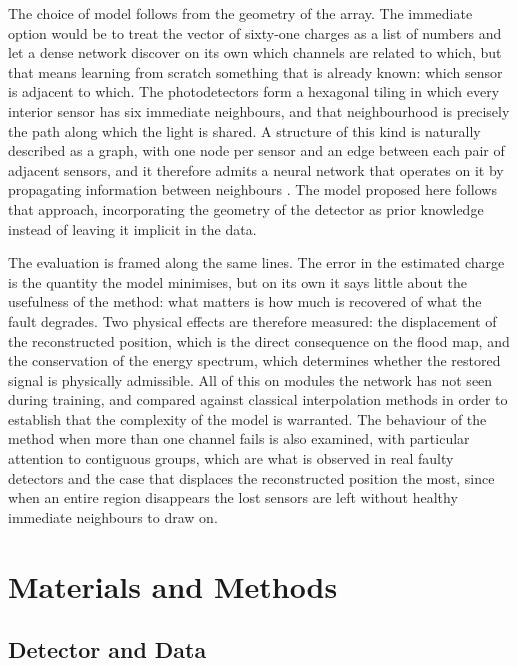 \documentclass[10pt,conference]{IEEEtran}
\begin{document}
The choice of model follows from the geometry of the array. The immediate
option would be to treat the vector of sixty-one charges as a list of
numbers and let a dense network discover on its own which channels are
related to which, but that means learning from scratch something that is
already known: which sensor is adjacent to which. The photodetectors form a
hexagonal tiling in which every interior sensor has six immediate
neighbours, and that neighbourhood is precisely the path along which the
light is shared. A structure of this kind is naturally described as a graph,
with one node per sensor and an edge between each pair of adjacent sensors,
and it therefore admits a neural network that operates on it by propagating
information between neighbours \cite{hamilton2017graphsage}. The model
proposed here follows that approach, incorporating the geometry of the
detector as prior knowledge instead of leaving it implicit in the data.

The evaluation is framed along the same lines. The error in the estimated
charge is the quantity the model minimises, but on its own it says little
about the usefulness of the method: what matters is how much is recovered of
what the fault degrades. Two physical effects are therefore measured: the
displacement of the reconstructed position, which is the direct consequence
on the flood map, and the conservation of the energy spectrum, which
determines whether the restored signal is physically admissible. All of this
on modules the network has not seen during training,
and compared against classical interpolation methods in order to establish
that the complexity of the model is warranted. The behaviour of the method
when more than one channel fails is also examined, with particular attention
to contiguous groups, which are what is observed in real faulty detectors
and the case that displaces the reconstructed position the most, since when an
entire region disappears the lost sensors are left without healthy immediate
neighbours to draw on.

\section{Materials and Methods}

\subsection{Detector and Data}
\label{sec:detector}
\end{document}
